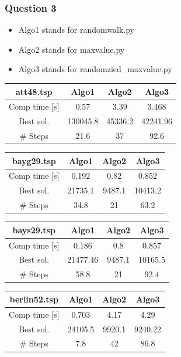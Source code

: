 \documentclass[a4paper,10pt]{article}
\begin{document}
\subsubsection{Question 3}
\begin{itemize}
\itemsep0em
\item Algo1 stands for randomwalk.py
\item Algo2 stands for maxvalue.py
\item Algo3 stands for randomzied\_maxvalue.py \\
\end{itemize}
\begin{center}
\begin{tabular}{|c|c|c|c|}
\hline 
att48.tsp & Algo1 & Algo2 & Algo3 \\ 
\hline 
Comp time [s] & 0.57 & 3.39 & 3.468 \\ 
\hline 
Best sol. & 130045.8 & 45336.2 & 42241.96 \\ 
\hline 
\# Steps & 21.6 & 37 & 92.6 \\ 
\hline 
\end{tabular} 
\end{center}
\begin{center}
\begin{tabular}{|c|c|c|c|}
\hline 
bayg29.tsp & Algo1 & Algo2 & Algo3 \\ 
\hline 
Comp time [s] & 0.192 & 0.82 & 0.852 \\ 
\hline 
Best sol. & 21735.1 & 9487.1 & 10413.2 \\ 
\hline 
\# Steps & 34.8 & 21 & 63.2 \\ 
\hline 
\end{tabular} 
\end{center}
\begin{center}
\begin{tabular}{|c|c|c|c|}
\hline 
bays29.tsp & Algo1 & Algo2 & Algo3 \\ 
\hline 
Comp time [s] & 0.186 & 0.8 & 0.857 \\ 
\hline 
Best sol. & 21477.46 & 9487.1 & 10165.5 \\ 
\hline 
\# Steps & 58.8 & 21 & 92.4 \\ 
\hline 
\end{tabular} 
\end{center}
\begin{center}
\begin{tabular}{|c|c|c|c|}
\hline 
berlin52.tsp & Algo1 & Algo2 & Algo3 \\ 
\hline 
Comp time [s] & 0.703 & 4.17 & 4.29 \\ 
\hline 
Best sol. & 24105.5 & 9920.1 & 9240.22 \\ 
\hline 
\# Steps & 7.8 & 42 & 86.8 \\ 
\hline 
\end{tabular} 
\end{center}
\end{document}
